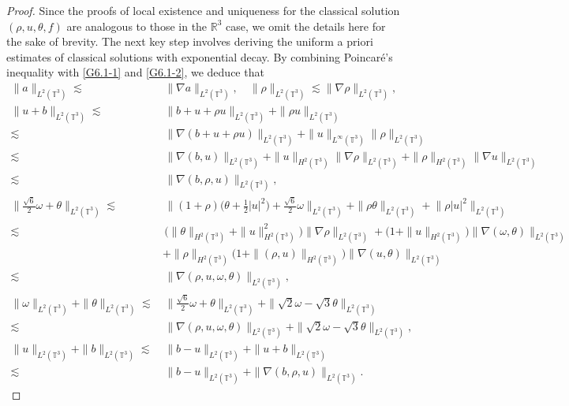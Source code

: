 \documentclass[reqno,11pt]{amsart}
\theoremstyle{plain}
\numberwithin{equation}{section}
\begin{document}
\begin{proof}
Since the proofs of local existence and uniqueness for the classical solution 
$(\rho, u, \theta, f)$ are analogous to those in the $\mathbb{R}^3$ case, we omit 
the details here for the sake of brevity. The next key step involves 
deriving the uniform a priori estimates of classical solutions with 
exponential decay. By combining   Poincar\'{e}'s inequality with \eqref{G6.1-1} and \eqref{G6.1-2},
 we deduce that 
\begin{align}
\|a\|_{L^2(\mathbb{T}^3)} \lesssim&\, \|\nabla a\|_{L^2(\mathbb{T}^3)},\quad
\|\rho\|_{L^2(\mathbb{T}^3)}\lesssim \|\nabla \rho\|_{L^2(\mathbb{T}^3)}, \label{G6.2}\\
\|u+b\|_{L^2(\mathbb{T}^3)}  \lesssim&\,\|b+u+\rho u\|_{L^2(\mathbb{T}^3)}
+\|\rho u\|_{L^2(\mathbb{T}^3)} \nonumber\\
\lesssim&\, \|\nabla(b+u+\rho u)\|_{L^2(\mathbb{T}^3)}
+\|u\|_{L^{\infty}(\mathbb{T}^3)}\|\rho\|_{L^2(\mathbb{T}^3)} \nonumber\\
\lesssim&\,  \|\nabla(b, u)\|_{L^2(\mathbb{T}^3)}
+ \|u\|_{H^2{(\mathbb{T}^3)}}\|\nabla \rho\|_{L^2(\mathbb{T}^3)}
+ \|\rho\|_{H^2{(\mathbb{T}^3)}}\|\nabla u\|_{L^2(\mathbb{T}^3)}\nonumber\\
\lesssim&\,  \|\nabla(b,\rho,u)\|_{L^2(\mathbb{T}^3)},\label{G6.4}\\
\Big\|\frac{\sqrt{6}} {2} \omega+\theta\Big\|_{L^2(\mathbb{T}^3)}  
\lesssim&\,\Big\|(1+\rho)\Big(\theta+\frac{1}{2}|u|^2\Big)
+\frac{\sqrt{6}}{2} \omega\Big\|_{L^2(\mathbb{T}^3)}
+\|\rho \theta\|_{L^2(\mathbb{T}^3)}+ \big\|\rho|u|^2 \big\|_{L^2(\mathbb{T}^3)}\nonumber \\
 \lesssim&\, \big (\|\theta\|_{H^2{(\mathbb{T}^3)}}
 +\|u\|_{H^2{(\mathbb{T}^3)}}^2 \big)\|\nabla \rho\|_{L^2(\mathbb{T}^3)}
 +\big(1+\|u\|_{H^2{(\mathbb{T}^3)}}\big)\|\nabla (\omega,\theta)\|_{L^2(\mathbb{T}^3)}\nonumber \\
&+ \|\rho\|_{H^2{(\mathbb{T}^3)}}\big(1+\|(\rho,u)\|_{H^2{(\mathbb{T}^3)}}\big)
\|\nabla (u,\theta)\|_{L^2(\mathbb{T}^3)} \nonumber\\
\lesssim&\,\|\nabla(\rho,u,\omega,\theta)\|_{L^2(\mathbb{T}^3)}, \label{G6.5}\\
\|\omega\|_{L^2(\mathbb{T}^3)}+\|\theta\|_{L^2(\mathbb{T}^3)} 
 \lesssim&\,   \Big\|\frac{\sqrt{6}}{2}   \omega
 +\theta\Big\|_{L^2(\mathbb{T}^3)}+\|\sqrt{2} \omega-\sqrt{3} \theta\|_{L^2(\mathbb{T}^3)}  \nonumber\\
\lesssim&\, \|\nabla(\rho,u,\omega,\theta)\|_{L^2(\mathbb{T}^3)}
+\|\sqrt{2} \omega-\sqrt{3} \theta\|_{L^2(\mathbb{T}^3)},\label{NJK3.1622}\\
\|u\|_{L^2(\mathbb{T}^3)}+\|b\|_{L^2(\mathbb{T}^3)}
\lesssim&\, \|b-u\|_{L^2(\mathbb{T}^3)}+\|u+b\|_{L^2(\mathbb{T}^3)} \nonumber\\
\lesssim&\,  \|b-u\|_{L^2(\mathbb{T}^3)}+\|\nabla(b,\rho,u)\|_{L^2(\mathbb{T}^3)}.\label{NJK3.163}
\end{align}



\end{proof}
\end{document}
